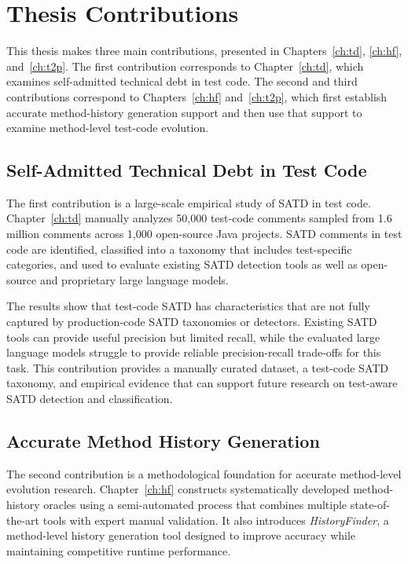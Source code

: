 \section{Thesis Contributions}

This thesis makes three main contributions, presented in Chapters~\ref{ch:td}, \ref{ch:hf}, and~\ref{ch:t2p}. The first contribution corresponds to Chapter~\ref{ch:td}, which examines self-admitted technical debt in test code. The second and third contributions correspond to Chapters~\ref{ch:hf} and~\ref{ch:t2p}, which first establish accurate method-history generation support and then use that support to examine method-level test-code evolution.

\subsection{Self-Admitted Technical Debt in Test Code}

The first contribution is a large-scale empirical study of SATD in test code. Chapter~\ref{ch:td} manually analyzes 50,000 test-code comments sampled from 1.6 million comments across 1,000 open-source Java projects. SATD comments in test code are identified, classified into a taxonomy that includes test-specific categories, and used to evaluate existing SATD detection tools as well as open-source and proprietary large language models.

The results show that test-code SATD has characteristics that are not fully captured by production-code SATD taxonomies or detectors. Existing SATD tools can provide useful precision but limited recall, while the evaluated large language models struggle to provide reliable precision-recall trade-offs for this task. This contribution provides a manually curated dataset, a test-code SATD taxonomy, and empirical evidence that can support future research on test-aware SATD detection and classification.

\subsection{Accurate Method History Generation}

The second contribution is a methodological foundation for accurate method-level evolution research. Chapter~\ref{ch:hf} constructs systematically developed method-history oracles using a semi-automated process that combines multiple state-of-the-art tools with expert manual validation. It also introduces \textit{HistoryFinder}, a method-level history generation tool designed to improve accuracy while maintaining competitive runtime performance.

